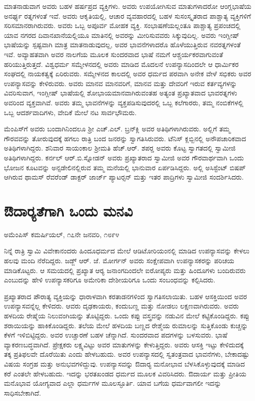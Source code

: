  ಮಾತನಾಡುವಾಗ ಅವರು ಬಹಳ ಹರ್ಷಪ್ರದ ವ್ಯಕ್ತಿಗಳು. ಅವರು ಉಪಯೋಗಿಸುವ ಮಾತುಗಳಾದರೋ ಆಂಗ್ಲಭಾಷೆಯ ಅನರ್ಘ್ಯ ರತ್ನಗಳಂತೆ ಇವೆ. ಅವರು ಆಕೃತಿಯಲ್ಲಿ, ಆಚಾರ ವ್ಯವಹಾರದಲ್ಲಿ ಬಹಳ ಸುಸಂಸ್ಕೃತರಾದ ಪಾಶ್ಚಾತ್ಯ ವ್ಯಕ್ತಿಗಳಿಗೆ ಸರಿಸಮಾನರಾಗಿರುವರು. ಅವರು ಒಬ್ಬ ಅಪೂರ್ವ ಮೋಹಕ ವ್ಯಕ್ತಿ. ಸಂಭಾಷಣೆಯಲ್ಲಂತೂ ಪಾಶ್ಚಾತ್ಯ ಪ್ರಪಂಚದಲ್ಲಿ ಯಾವ ನಗರದ ದಿವಾನಖಾನೆಯಲ್ಲಿಯೂ ಮಾತಿನಲ್ಲಿ ಅವರನ್ನು ಮೀರಿಸುವವರು ಸಿಕ್ಕುವುದಿಲ್ಲ. ಅವರು ಇಂಗ್ಲೀಷ್ ಭಾಷೆಯನ್ನು ಸ್ಪಷ್ಟವಾಗಿ ಮಾತ್ರ ಮಾತನಾಡುವುದಲ್ಲ, ಅವರ ಭಾವನೆಗಳಾದರೊ ಹೊಳೆಯುತ್ತಿರುವ ನವರತ್ನಗಳಂತೆ ಇವೆ. ಅವ್ಯಾಹತವಾಗಿ ಅವರ ನಾಲಗೆಯ ಮೂಲಕ ಸುಂದರವಾದ ಭಾಷೆ ನಮಗೆ ಆಶ್ಚರ್ಯಕರವಾಗುವಂತೆ ಹರಿಯುತ್ತಿರುತ್ತದೆ. ವಿಶ್ವಧರ್ಮ ಸಮ್ಮೇಳನದಲ್ಲಿ ಅವರು ಮಾಡಿದ ಮೊದಲನೆ ಉಪನ್ಯಾಸದಿಂದಲೇ ಆ ಧಾರ್ಮಿಕರ ಸಂಘದಲ್ಲಿ ನಾಯಕತ್ವಕ್ಕೆ ಏರಿರುವರು. ಸಮ್ಮೇಳನದ ಕಾಲದಲ್ಲಿ ಅವರ ಧರ್ಮದ ಪರವಾಗಿ ಅನೇಕ ವೇಳೆ ಸಭಿಕರು ಅವರ ಉಪನ್ಯಾಸವನ್ನು ಕೇಳಿರುವರು. ಅವರು ಮಾನವ ಮಾನವರಿಗೆ, ಮಾನವ ಮತ್ತು ದೇವರಿಗೆ ಇರುವ ಕರ್ತವ್ಯಗಳನ್ನು ವಿವರಿಸುವಾಗ, ಇಂಗ್ಲೀಷ್ ಭಾಷೆಯಲ್ಲಿ ಶೋಭಾಯಮಾನವಾಗಿರುವಂತಹ ಅತ್ಯಂತ ಪ್ರಖ್ಯಾತವಾದ ಭಾವರತ್ನಗಳು ಅವರಿಂದ ವ್ಯಕ್ತವಾಗಿವೆ. ಅವರು ತಮ್ಮ ಭಾವನೆಗಳನ್ನು ವ್ಯಕ್ತಪಡಿಸುವುದರಲ್ಲಿ ಒಬ್ಬ ಕಲೆಗಾರರು, ತಮ್ಮ ನಂಬಿಕೆಗಳಲ್ಲಿ ಒಬ್ಬ ಆದರ್ಶವಾದಿಗಳು, ವೇದಿಕೆ ಮೇಲೆ ನಟ ಸಾರ್ವಭೌಮರು. 

 ಮೆಂಪಿಸ್‍ಗೆ ಅವರು ಬಂದಾಗಿನಿಂದಲೂ ಶ‍್ರೀ ಎಚ್.ಎಲ್. ಬ್ರನ್‍ಕ್ಲಿ ಅವರ ಅತಿಥಿಗಳಾಗಿರುವರು. ಅಲ್ಲಿಗೆ ತಮ್ಮ ಗೌರವವನ್ನು ತೋರುವುದಕ್ಕೆ ಹಗಲು ರಾತ್ರಿ ಬಂದ ಜನರನ್ನು ಸ್ವಾಗತಿಸಿರುವರು. ಟೆನಿಸ್ ಕ್ಲಬ್ಬಿನಲ್ಲಿ ಅನೌಪಚಾರಿಕವಾದ ಅತಿಥಿಗಳಾಗಿದ್ದರು. ಶನಿವಾರ ಸಾಯಂಕಾಲ ಶ‍್ರೀಮತಿ ಹೆಚ್.ಆರ್. ಶಪರ‍್ಡ ಅವರು ಕೊಟ್ಟ ಸ್ವಾಗತದಲ್ಲಿ ಸ್ವಾಮೀಜಿ ಅತಿಥಿಗಳಾಗಿದ್ದರು. ಕರ್ನಲ್ ಆರ್.ಬಿ.ಸ್ನೋಡನ್ ಅವರು ಪ್ರಖ್ಯಾತರಾದ ಸ್ವಾಮೀಜಿ ಅವರ ಗೌರವಾರ್ಥವಾಗಿ ಒಂದು ಭೋಜನ ಕೂಟವನ್ನು ಅನ್ಸ‍ಡೇಲಿನಲ್ಲಿರುವ ತಮ್ಮ ಮನೆಯಲ್ಲಿ ಭಾನುವಾರ ಏರ್ಪಡಿಸಿದ್ದರು. ಅಲ್ಲಿ ಅಸಿಸ್ಟೆಂಟ್ ಬಿಷಪ್ ಆಗಿರುವ ಥಾಮಸ್ ರೆವರೆಂಡ್ ಡಾಕ್ಟರ್ ಜಾರ್ಜ್ ಪ್ಯಾಟರ್‍ಸನ್ ಮತ್ತು ಇತರ ಪಾದ್ರಿಗಳು ಸ್ವಾಮೀಜಿ ಸಂದರ್ಶಿಸಿದರು.


\section*{ಔದಾರ‍್ಯತೆಗಾಗಿ ಒಂದು ಮನವಿ}

\begin{flushright}
ಅಮೆಂಪಿಸ್ ಕಮರ್ಷಿಯಲ್, ೧೭ನೇ ಜನವರಿ, ೧೮೯೪ 
\end{flushright}

 ನಿನ್ನೆ ರಾತ್ರಿ ಸ್ವಾಮಿ ವಿವೇಕಾನಂದರು ಹಿಂದೂಧರ್ಮದ ಮೇಲೆ ಆಡಿಟೋರಿಯಂನಲ್ಲಿ ಮಾಡಿದ ಉಪನ್ಯಾಸವನ್ನು ಕೇಳಲು ಹಲವು ಮಂದಿ ನೆರೆದಿದ್ದರು. ಜಡ್ಜ್ ಆರ್. ಜೆ. ಮೋರ್ಗನ್ ಅವರು ಸಂಕ್ಷೇಪವಾಗಿ ಉಪನ್ಯಾಸಕರನ್ನು ಪರಿಚಯ ಮಾಡಿಕೊಟ್ಟರು. ಆ ಸಮಯದಲ್ಲಿ ಪ್ರಖ್ಯಾತ ಆರ‍್ಯ ಜನಾಂಗದಿಂದಲೇ ಐರೋಪ್ಯರು ಮತ್ತು ಹಿಂದೂಗಳು ಬಂದಿರುವರು ಎಂಬುದನ್ನು ಹೇಳಿ ಉಪನ್ಯಾಸಕರಿಗೂ ಅಮೇರಿಕಾ ದೇಶೀಯರಿಗೂ ಒಂದು ಸಂಬಂಧವನ್ನು ಕಲ್ಪಿಸಿದರು. 

 ಪ್ರಖ್ಯಾತರಾದ ಪೌರಾತ್ಯ ವ್ಯಕ್ತಿಯನ್ನು ಧಾರಾಳವಾಗಿ ಕರತಾಡನಗಳಿಂದ ಸ್ವಾಗತಿಸಲಾಯಿತು. ಬಹಳ ಆಸಕ್ತಿಯಿಂದ ಅವರ ಉಪನ್ಯಾಸವನ್ನೆಲ್ಲ ಕೇಳಿದರು. ಆವರು ದೃಢಕಾಯರು, ಕಂದುಬಣ್ಣ ಮತ್ತು ನೋಡಲು ಲಕ್ಷಣವಾಗಿರುವರು. ಅವರು ಹಳದಿಯ ರೇಷ್ಮೆಯ ನಿಲುವಂಗಿಯನ್ನು ತೊಟ್ಟಿದ್ದರು. ಒಂದು ಕಪ್ಪು ವಸ್ತ್ರವನ್ನು ನಡುವಿನ ಮೇಲೆ ಕಟ್ಟಿಕೊಂಡಿದ್ದರು. ಕಪ್ಪು ಶರಾಯಿಯನ್ನು ಹಾಕಿಕೊಂಡಿದ್ದರು. ತಲೆಯ ಮೇಲೆ ಹಳದಿಯ ಬಣ್ಣದ ರೇಶ್ಮೆಯ ರುಮಾಲನ್ನು ಸುತ್ತಿಕೊಂಡು ಕುಚ್ಚನ್ನು ಕೆಳಗೆ ಇಳಿಬಿಟ್ಟಿದ್ದರು. ಅವರ ಉಚ್ಚಾರಣೆ ಬಹಳ ಚೆನ್ನಾಗಿದೆ. ಸುಂದರವಾದ ಪದಗಳನ್ನು ಬಳಸುವರು. ಭಾಷೆ ವ್ಯಾಕರಣಬದ್ಧವಾಗಿದೆ. ಪ್ರೇಕ್ಷಕರು ಲಕ್ಷ್ಯವಿಟ್ಟು ಅವರ ಮಾತುಗಳನ್ನು ಕೇಳುತ್ತಿದ್ದರು. ಅವರು ಆಸಕ್ತಿ ಇಟ್ಟು ಕೇಳಿದುದಕ್ಕೆ ತಕ್ಕ ಪ್ರತಿಫಲವೇ ದೊರೆಯಿತು ಎಂದು ಹೇಳಬಹುದು. ಅವರ ಉಪನ್ಯಾಸದಲ್ಲಿ ಸ್ವತಂತ್ರವಾದ ಭಾವನೆಗಳು, ಬೇಕಾದಷ್ಟು ವಿಷಯ ಸಂಗ್ರಹ ಮತ್ತು ಅನುಭವಗಳಿದ್ದುವು. ಉಪನ್ಯಾಸವನ್ನು ಔದಾರ‍್ಯ ಮನೋಭಾವ ಬೆಳಸಿಕೊಳ್ಳುವುದಕ್ಕೆ ಮಾಡಿದ ಕರೆ ಎಂತಲೇ ಹೇಳಬಹುದು. ಇದನ್ನು ಭರತಖಂಡದ ಧರ್ಮದ ಮೂಲಕ ವಿವರಿಸಿದರು. ಔದಾರ್ಯ ಮತ್ತು ಪ್ರೀತಿಯ ಮನೊಭಾವ ಯೋಗ್ಯವಾದ ಎಲ್ಲಾ ಧರ್ಮಗಳ ಮೂಲಸ್ಫೂರ್ತಿ. ಯಾವ ಬಗೆಯ ಧರ್ಮವಾಗಲೀ ಇದನ್ನು ಸಾಧಿಸಬೇಕಾಗಿದೆ. 

